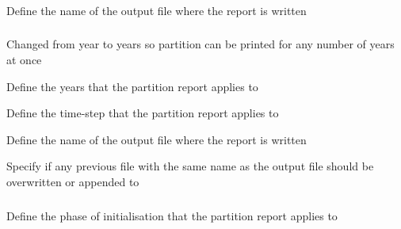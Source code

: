 \subsubsection[Print the spatial co-ordinates of each spatial cell (i.e., row and column labels of each spatial cell) of the spatial structure]{}

 {Define the name of the output file where the report is written}

\subsubsection[Print the partition]{}

\TODO

Changed from year to years so partition can be printed for any number of years at once

 {Define the years that the partition report applies to}

\TODOend

 {Define the time-step that the partition report applies to}

 {Define the name of the output file where the report is written}

 {Specify if any previous file with the same name as the output file should be overwritten or appended to}

\subsubsection[Print the partition at initialisation]{}

 {Define the phase of initialisation that the partition report applies to}

